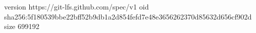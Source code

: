version https://git-lfs.github.com/spec/v1
oid sha256:5f180539bbe22bff52b9db1a2d854fefd7e48e3656262370d85632d656cf902d
size 699192
